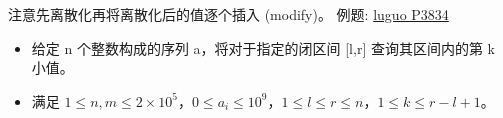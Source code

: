 注意先离散化再将离散化后的值逐个插入 (modify)。
例题: \href{https://www.luogu.com.cn/problem/P3834}{luguo P3834}
\begin{itemize}
    \item 给定 n 个整数构成的序列 a，将对于指定的闭区间 [l,r] 查询其区间内的第 k 小值。
    \item 满足 $1 \leq n,m \leq 2\times 10^5$，$0\le a_i \leq 10^9$，$1 \leq l \leq r \leq n$，$1 \leq k \leq r - l + 1$。
\end{itemize}